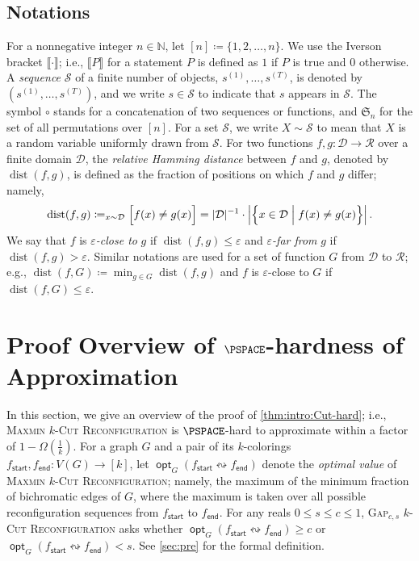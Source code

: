 \documentclass[11pt,fleqn]{article}
\renewcommand{\geq}{\geqslant}
\renewcommand{\leq}{\leqslant}
\renewcommand{\epsilon}{\varepsilon}
\newcommand{\prb}[1]{\textsc{#1}\xspace}
\newcommand{\reco}{\leftrightsquigarrow}
\newcommand{\defeq}{\coloneq}
\DeclareMathOperator{\opt}{\mathsf{opt}}
\DeclareMathOperator{\rHam}{\mathrm{dist}}
\newcommand{\sss}{\mathsf{start}}
\newcommand{\ttt}{\mathsf{end}}
\newcommand{\f}{f}
\newcommand{\kCutReconf}{\prb{$k$-Cut Reconfiguration}}
\newcommand{\MMkCutReconf}{\prb{Maxmin $k$-Cut Reconfiguration}}
\newcommand{\calD}{\mathcal{D}}
\newcommand{\calR}{\mathcal{R}}
\newcommand{\calS}{\mathcal{S}}
\newcommand{\bbN}{\mathbb{N}}
\newcommand{\scrS}{\mathscr{S}}
\let\Pr\relax\DeclareMathOperator*{\Pr}{\mathbb{P}}
\theoremstyle{definition}
\numberwithin{equation}{section}
\begin{document}
\subsection{Notations}
For a nonnegative integer $n \in \bbN$, let $[n] \defeq \{1,2,\ldots,n\}$.
We use the Iverson bracket $\llbracket \cdot \rrbracket$; i.e.,
$\llbracket P \rrbracket$ for a statement $P$
is defined as $1$ if $P$ is true and $0$ otherwise.
A \emph{sequence} $\scrS$ of a finite number of objects, $s^{(1)}, \ldots, s^{(T)}$,
is denoted by $(s^{(1)}, \ldots, s^{(T)})$, and
we write $s \in \scrS$ to indicate that $s$ appears in $\scrS$.
The symbol $\circ$ stands for a concatenation of two sequences or functions, and
$\mathfrak{S}_n$ for the set of all permutations over $[n]$.
For a set $\calS$,
we write $X \sim \calS$ to mean that 
$X$ is a random variable uniformly drawn from $\calS$.
For two functions $f,g \colon \calD \to \calR$ over a finite domain $\calD$,
the \emph{relative Hamming distance} between $f$ and $g$,
denoted by $\rHam(f,g)$,
is defined as the fraction of positions on which $f$ and $g$ differ; namely,
\begin{align}
    \rHam(f,g) \defeq
    \Pr_{x \sim \calD}\Bigl[ f(x) \neq g(x) \Bigr]
    = |\calD|^{-1} \cdot \left|\Bigl\{x \in \calD \Bigm| f(x) \neq g(x) \Bigr\}\right|.
\end{align}
We say that $f$ is \emph{$\epsilon$-close to} $g$ if $\rHam(f,g) \leq \epsilon$ and
\emph{$\epsilon$-far from} $g$ if $\rHam(f,g) > \epsilon$.
Similar notations are used
for a set of function $G$ from $\calD$ to $\calR$; e.g.,
$\rHam(f,G) \defeq \min_{g \in G} \rHam(f,g)$ and
$f$ is $\epsilon$-close to $G$ if $\rHam(f,G) \leq \epsilon$.







\section{Proof Overview of $\PSPACE$-hardness of Approximation}
\label{sec:overview-Cut-hard}

In this section,
we give an overview of the proof of \cref{thm:intro:Cut-hard}; i.e.,
\MMkCutReconf is $\PSPACE$-hard to approximate within a factor of $1-\Omega\left(\frac{1}{k}\right)$.
For a graph $G$ and a pair of its $k$-colorings $\f_\sss,\f_\ttt \colon V(G) \to [k]$,
let $\opt_G(\f_\sss \reco \f_\ttt)$ denote
the \emph{optimal value} of \MMkCutReconf; namely,
the maximum of the minimum fraction of bichromatic edges of $G$,
where the maximum is taken over all possible reconfiguration sequences
from $\f_\sss$ to $\f_\ttt$.
For any reals $0 \leq s \leq c \leq 1$,
\prb{Gap$_{c,s}$ \kCutReconf} asks
whether $\opt_G(\f_\sss \reco \f_\ttt) \geq c$ or
$\opt_G(\f_\sss \reco \f_\ttt) < s$.
See \cref{sec:pre} for the formal definition.
\end{document}
